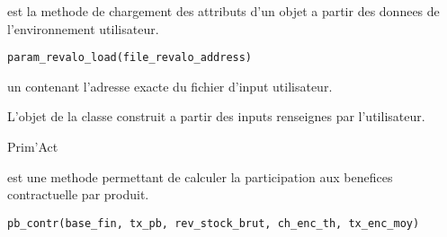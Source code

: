\documentclass[a4paper]{book}
\begin{document}
%
\begin{Description}\relax
{} est la methode de chargement des attributs d'un objet 
a partir des donnees de l'environnement utilisateur.
\end{Description}
%
\begin{Usage}
\begin{verbatim}
param_revalo_load(file_revalo_address)
\end{verbatim}
\end{Usage}
%
\begin{Arguments}
\begin{ldescription}
\item[\code{file\_revalo\_address}] un  contenant l'adresse exacte
du fichier d'input utilisateur.
\end{ldescription}
\end{Arguments}
%
\begin{Value}
L'objet de la classe  construit a partir des inputs renseignes par l'utilisateur.
\end{Value}
%
\begin{Author}\relax
Prim'Act
\end{Author}
%
\begin{Description}\relax
{} est une methode permettant de calculer la participation aux benefices contractuelle par produit.
\end{Description}
%
\begin{Usage}
\begin{verbatim}
pb_contr(base_fin, tx_pb, rev_stock_brut, ch_enc_th, tx_enc_moy)
\end{verbatim}
\end{Usage}
%
\end{document}
